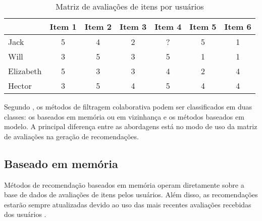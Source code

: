     
    \begin{table}[htb]
        \centering
        \caption{Matriz de avaliações de itens por usuários}
        \label{tab:matriz-av-item-user}
        \begin{tabular}{@{}lcccccc@{}}
        \toprule
                  & Item 1 & Item 2 & Item 3 & Item 4 & Item 5 & Item 6 \\ \midrule
        Jack      & 5      & 4      & 2      & ?      & 5      & 1      \\
        Will      & 3      & 5      & 3      & 5      & 1      & 1      \\
        Elizabeth & 5      & 3      & 3      & 4      & 2      & 4      \\
        Hector    & 3      & 5      & 4      & 5      & 4      & 4      \\ \bottomrule
        \end{tabular}
    \end{table}
    
    Segundo , os métodos de filtragem colaborativa podem ser classificados em duas classes: os baseados em memória ou em vizinhança e os métodos baseados em modelo. A principal diferença entre as abordagens está no modo de uso da matriz de avaliações na geração de recomendações. 
    
    
        
    \subsection{Baseado em memória}
        
        Métodos de recomendação baseados em memória operam diretamente sobre a base de dados de avaliações de itens pelos usuários. Além disso, as recomendações estarão sempre atualizadas devido ao uso das mais recentes avaliações recebidas dos usuários \cite{Bobadilla_2013}. 
        
        

